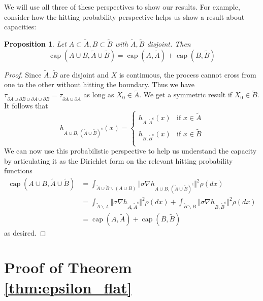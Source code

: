 \documentclass[nofootinbib,english, aip, jcp, priprint, graphicx,floatfix]{revtex4-1}
\newtheorem{proposition}{Proposition}
\theoremstyle{plain}
\theoremstyle{definition}
\theoremstyle{plain}
\newcommand{\capac}[2]{\ensuremath{\operatorname{cap}}(#1,#2)}
\begin{document}
We will use all three of these perspectives to show our results.  For example, consider how the hitting probability perspective helps us show a result about capacities:
\begin{proposition}\label{prop:capacity}
Let $A\subset \tilde A,B\subset \tilde B$ with $\tilde A,\tilde B$ disjoint.  Then 
\[
\capac{A\cup B}{\tilde A \cup \tilde B}=\capac{A}{\tilde A}+\capac{B}{\tilde B}
\]
\end{proposition}
\begin{proof}
Since $\tilde A,\tilde B$ are disjoint and $X$ is continuous, the process cannot cross from one to the other without hitting the boundary.  Thus we have $\tau_{\partial \tilde A\cup \partial \tilde B \cup \partial A \cup \partial B}=\tau_{\partial \tilde A \cup \partial A}$ as long as $X_0\in\tilde A$.  We get a symmetric result if $X_0\in \tilde B$.  It follows that
\[
h_{A\cup B,(\tilde A\cup\tilde B)^c}(x) = 
    \begin{cases}
    h_{A,\tilde A^c}(x) & \mbox{if }x\in \tilde A\\
    h_{B,\tilde B^c}(x) & \mbox{if }x\in \tilde B\\
    \end{cases}
\]
We can now use this probabilistic perspective to help us understand the capacity by articulating it as the Dirichlet form on the relevant hitting probability functions
\begin{align*}
\capac{A\cup B}{\tilde A \cup \tilde B} 
        &= \int_{\tilde A\cup \tilde B \backslash (A\cup B)} \Vert \sigma \nabla h_{A\cup B,(\tilde A \cup \tilde B)^c}\Vert^2\rho(dx) \\
        &= \int_{\tilde A \backslash A} \Vert \sigma \nabla h_{A,\tilde A^c}\Vert^2\rho(dx)
            +\int_{\tilde B \backslash B} \Vert \sigma \nabla h_{B,\tilde B^c}\Vert^2 \rho(dx) \\
        &= \capac{A}{\tilde A}+\capac{B}{\tilde B}
\end{align*}
as desired.
\end{proof}

                                                       



\section{Proof of Theorem \ref{thm:epsilon_flat}}
\label{sec:proof_epsilon_flat}
\end{document}
